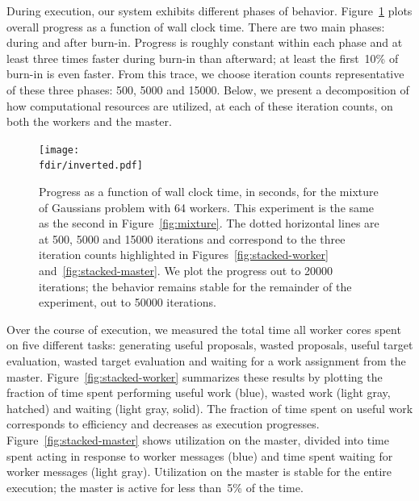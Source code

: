 \documentclass[angelino.tex]{subfiles}
\newcommand{\fdir}{/Users/elaine/Dropbox/nips12-mcmc/consolidate/mixture-thesis}
\begin{document}
During execution, our system exhibits different phases of behavior.
Figure~\ref{fig:progress} plots overall progress as a function of wall clock time.
There are two main phases: during and after burn-in.
Progress is roughly constant within each phase
and at least three times faster during burn-in than afterward;
at least the first~10\% of burn-in is even faster.
From this trace, we choose iteration counts representative of these three phases:
500, 5000 and 15000.
Below, we present a decomposition of how computational resources are utilized,
at each of these iteration counts, on both the workers and the master.


\begin{figure}[t!]
\begin{center}
\texttt{[image: \\fdir/inverted.pdf]}
\end{center}
\caption{Progress as a function of wall clock time, in seconds, for the mixture
of Gaussians problem with 64 workers.
This experiment is the same as the second in Figure~\ref{fig:mixture}.
The dotted horizontal lines are at 500, 5000 and 15000 iterations
and correspond to the three iteration counts highlighted in
Figures~\ref{fig:stacked-worker} and~\ref{fig:stacked-master}.
We plot the progress out to 20000 iterations; the behavior remains stable for
the remainder of the experiment, out to 50000 iterations.}
\label{fig:progress}
\end{figure}



Over the course of execution, we measured the total time all worker cores
spent on five different tasks: generating useful proposals, wasted proposals,
useful target evaluation, wasted target evaluation
and waiting for a work assignment from the master.
Figure~\ref{fig:stacked-worker} summarizes these results by plotting the
fraction of time spent performing useful work (blue),
wasted work (light gray, hatched) and waiting (light gray, solid).
The fraction of time spent on useful work corresponds to efficiency
and decreases as execution progresses.
%
Figure~\ref{fig:stacked-master} shows utilization on the master,
divided into time spent acting in response to worker messages (blue)
and  time spent waiting for worker messages (light gray).
Utilization on the master is stable for the entire execution;
the master is active for less than~5\% of the time.
\end{document}
